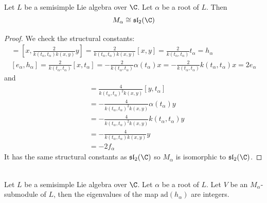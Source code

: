 \documentclass[a4paper]{article}
\begin{document}
\begin{prp}{}{} \\Let $L$ be a semisimple Lie algebra over $\C$. Let $\alpha$ be a root of $L$. Then $$M_\alpha\cong\mathfrak{sl}_2(\C)$$ 
\begin{proof}
We check the structural constants: 
\begin{align*}
[e_\alpha,f_\alpha]=\left[x,\frac{2}{k(t_\alpha,t_\alpha)k(x,y)}y\right]=\frac{2}{k(t_\alpha,t_\alpha)k(x,y)}[x,y]=\frac{2}{k(t_\alpha,t_\alpha)}t_\alpha=h_\alpha\\
[e_\alpha,h_\alpha]=\frac{2}{k(t_\alpha,t_\alpha)}[x,t_\alpha]=-\frac{2}{k(t_\alpha,t_\alpha)}\alpha(t_\alpha)x=-\frac{2}{k(t_\alpha,t_\alpha)}k(t_\alpha,t_\alpha)x=2e_\alpha
\end{align*} and 
\begin{align*}
[f_\alpha,h_\alpha]&=\frac{4}{k(t_\alpha,t_\alpha)^2k(x,y)}[y,t_\alpha]\\
&=-\frac{4}{k(t_\alpha,t_\alpha)^2k(x,y)}\alpha(t_\alpha)y\\
&=-\frac{4}{k(t_\alpha,t_\alpha)^2k(x,y)}k(t_\alpha,t_\alpha)y\\
&=-\frac{4}{k(t_\alpha,t_\alpha)k(x,y)}y\\
&=-2f_\alpha
\end{align*}
It has the same structural constants as $\mathfrak{sl}_2(\C)$ so $M_\alpha$ is isomorphic to $\mathfrak{sl}_2(\C)$. 
\end{proof}
\end{prp}

\begin{prp}{}{} \\Let $L$ be a semisimple Lie algebra over $\C$. Let $\alpha$ be a root of $L$. Let $V$ be an $M_\alpha$-submodule of $L$, then the eigenvalues of the map $\text{ad}(h_\alpha)$ are integers. 
\end{prp}
\end{document}

